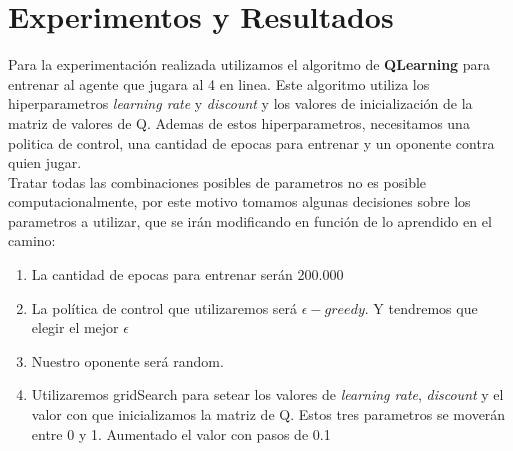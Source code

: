 \section{Experimentos y Resultados}
%
%
%
%
%

Para la experimentación realizada utilizamos el algoritmo de \textbf{QLearning} para entrenar al agente que jugara al 4 en linea. Este algoritmo utiliza los hiperparametros \textit{learning rate} y \textit{discount} y los valores de inicialización
 de la matriz de valores de Q. Ademas de estos hiperparametros, necesitamos una politica de control, una cantidad de epocas para entrenar y un oponente contra quien jugar.  \\

Tratar todas las combinaciones posibles de parametros no es posible computacionalmente, por este motivo tomamos algunas decisiones sobre los parametros a utilizar, que se irán modificando en función de lo aprendido en el camino:

\begin{enumerate}
\item La cantidad de epocas para entrenar serán 200.000
\item La política de control que utilizaremos será \textbf{$\epsilon-greedy$}. Y tendremos que elegir el mejor $\epsilon$
\item Nuestro oponente será random.
\item Utilizaremos gridSearch para setear los valores de \textit{learning rate},  \textit{discount} y el valor con que inicializamos la matriz de Q. Estos tres parametros se moverán entre 0 y 1. Aumentado el valor con pasos de 0.1
\end{enumerate}

